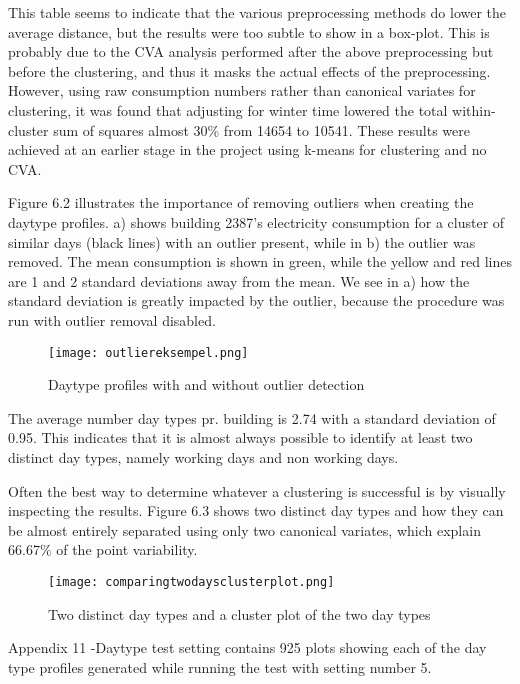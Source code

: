 This table seems to indicate that the various preprocessing methods do lower the average distance, but the results were too subtle to show in a box-plot. This is probably due to the CVA analysis performed after the above preprocessing but before the clustering, and thus it masks the actual effects of the preprocessing. However, using raw consumption numbers rather than canonical variates for clustering, it was found that adjusting for winter time lowered the total within-cluster sum of squares almost 30\% from 14654 to 10541. These results were achieved at an earlier stage in the project using k-means for clustering and no CVA.

Figure 6.2 illustrates the importance of removing outliers when creating the daytype profiles. a) shows building 2387’s electricity consumption for a cluster of similar days (black lines) with an outlier present, while in b) the outlier was removed. The mean consumption is shown in green, while the yellow and red lines are 1 and 2 standard deviations away from the mean. We see in a) how the standard deviation is greatly impacted by the outlier, because the procedure was run with outlier removal disabled.
\begin{figure}
\begin{center}
\texttt{[image: outliereksempel.png]}
\end{center}
\caption{Daytype profiles with and without outlier detection}
\end{figure}

The average number day types pr. building is 2.74 with a standard deviation of 0.95. This indicates that it is almost always possible to identify at least two distinct day types, namely working days and non working days. 

Often the best way to determine whatever a clustering is successful is by visually inspecting the results. Figure 6.3 shows two distinct day types and how they can be almost entirely separated using only two canonical variates, which explain 66.67\% of the point variability.
\begin{figure}
\begin{center}
\texttt{[image: comparingtwodaysclusterplot.png]}
\end{center}
\caption{Two distinct day types and a cluster plot of the two day types}
\end{figure}

Appendix 11 -Daytype test setting contains 925 plots showing each of the day type profiles generated while running the test with setting number 5.

